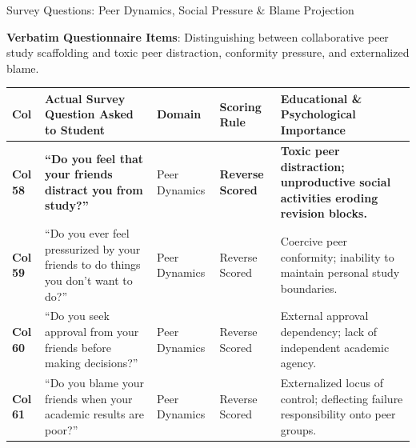 \documentclass{beamer}
\begin{document}
\begin{frame}[t]{Survey Questions: Peer Dynamics, Social Pressure \& Blame Projection}
  \vspace{-0.20cm}
  \begin{topsummarybar}
    \fontsize{5.8pt}{7.0pt}\selectfont
    \textbf{\color{NavyDark}Verbatim Questionnaire Items}: Distinguishing between collaborative peer study scaffolding and toxic peer distraction, conformity pressure, and externalized blame.
  \end{topsummarybar}
  \vspace{-0.25cm}

  \begin{tcolorbox}[colback=white, colframe=BlueDeep, arc=1.2mm, boxrule=0.7pt, top=0.3mm, bottom=0.3mm, left=0.8mm, right=0.8mm]
    \fontsize{4.2pt}{5.0pt}\selectfont
    \renewcommand{\arraystretch}{0.55}
    \begin{tabularx}{\linewidth}{@{}p{0.7cm} p{4.2cm} p{1.6cm} p{1.6cm} X@{}}
      \toprule
      \rowcolor{NavyDark}
      \textbf{\color{white}Col} & \textbf{\color{white}Actual Survey Question Asked to Student} & \textbf{\color{white}Domain} & \textbf{\color{white}Scoring Rule} & \textbf{\color{white}Educational \& Psychological Importance} \\
      \midrule
      \rowcolor{GoldBG} \textbf{Col 58} & \textbf{``Do you feel that your friends distract you from study?''} & Peer Dynamics & \textbf{Reverse Scored} & \textbf{Toxic peer distraction; unproductive social activities eroding revision blocks.} \\
      \rowcolor{BlueLight} \textbf{Col 59} & ``Do you ever feel pressurized by your friends to do things you don't want to do?'' & Peer Dynamics & Reverse Scored & Coercive peer conformity; inability to maintain personal study boundaries. \\
      \rowcolor{CanvasBG} \textbf{Col 60} & ``Do you seek approval from your friends before making decisions?'' & Peer Dynamics & Reverse Scored & External approval dependency; lack of independent academic agency. \\
      \rowcolor{BlueLight} \textbf{Col 61} & ``Do you blame your friends when your academic results are poor?'' & Peer Dynamics & Reverse Scored & Externalized locus of control; deflecting failure responsibility onto peer groups. \\

\end{tabularx}
\end{tcolorbox}
\end{frame}
\end{document}
